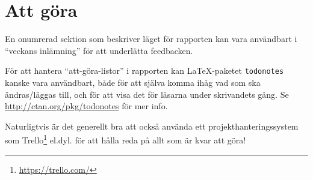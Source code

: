 
\newpage
\section*{Att göra}
En onumrerad sektion som beskriver läget för rapporten kan vara användbart i ``veckans inlämning'' för att underlätta feedbacken.

För att hantera ``att-göra-listor'' i rapporten kan La\TeX-paketet \verb|todonotes| kanske vara användbart, både för att själva komma ihåg vad som ska ändras/läggas till, och för att visa det för läsarna under skrivandets gång. Se \url{http://ctan.org/pkg/todonotes} för mer info.

Naturligtvis är det generellt bra att också använda ett projekthanteringssystem som Trello\footnote{\url{https://trello.com/}} el.dyl. för att hålla reda på allt som är kvar att göra!

